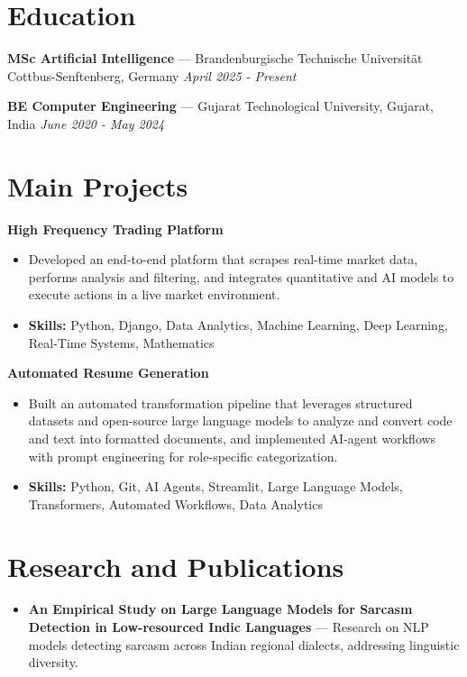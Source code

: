 \documentclass[a4paper,10pt]{article}
\begin{document}
\section*{Education}
\textbf{MSc Artificial Intelligence} — Brandenburgische Technische Universität Cottbus-Senftenberg, Germany \hfill \textit{April 2025 - Present}\par
\vspace{1.5pt}
\textbf{BE Computer Engineering} — Gujarat Technological University, Gujarat, India \hfill \textit{June 2020 - May 2024}\par

\section*{Main Projects}
\textbf{High Frequency Trading Platform}\par
\vspace{1pt}
\begin{itemize}
  \item Developed an end-to-end platform that scrapes real-time market data, performs analysis and filtering, and integrates quantitative and AI models to execute actions in a live market environment.
  \item \textbf{Skills:} Python, Django, Data Analytics, Machine Learning, Deep Learning, Real-Time Systems, Mathematics
\end{itemize}
\vspace{3pt}
\textbf{Automated Resume Generation}\par
\vspace{1pt}
\begin{itemize}
  \item Built an automated transformation pipeline that leverages structured datasets and open-source large language models to analyze and convert code and text into formatted documents, and implemented AI-agent workflows with prompt engineering for role-specific categorization.
  \item \textbf{Skills:} Python, Git, AI Agents, Streamlit, Large Language Models, Transformers, Automated Workflows, Data Analytics
\end{itemize}

\section*{Research and Publications}
\begin{itemize}
\item \textbf{An Empirical Study on Large Language Models for Sarcasm Detection in Low-resourced Indic Languages} — Research on NLP models detecting sarcasm across Indian regional dialects, addressing linguistic diversity.
\end{itemize}
\end{document}

